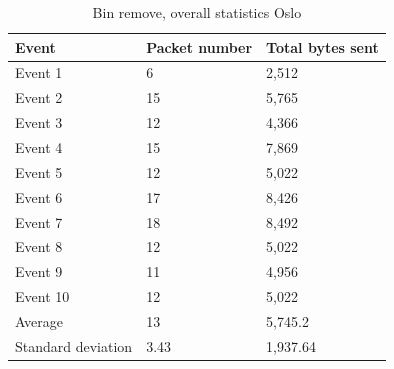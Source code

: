 \begin{table}[H]
\centering
\caption{Bin remove, overall statistics Oslo}
\label{tab:BRoverallOslo}
\begin{tabular}{|l|l|l|}
\hline
\textbf{Event} & \textbf{Packet number} & \textbf{Total bytes sent} \\ \hline
Event 1        & 6                      & 2,512                      \\ \hline
Event 2        & 15                     & 5,765                      \\ \hline
Event 3        & 12                     & 4,366                      \\ \hline
Event 4        & 15                     & 7,869                      \\ \hline
Event 5        & 12                     & 5,022                      \\ \hline
Event 6        & 17                     & 8,426                      \\ \hline
Event 7        & 18                     & 8,492                      \\ \hline
Event 8        & 12                     & 5,022                      \\ \hline
Event 9        & 11                     & 4,956                      \\ \hline
Event 10       & 12                     & 5,022                      \\ \hline
Average        & 13                     & 5,745.2                    \\ \hline
Standard deviation        & 3.43
       & 1,937.64               \\ \hline
\end{tabular}
\end{table}



